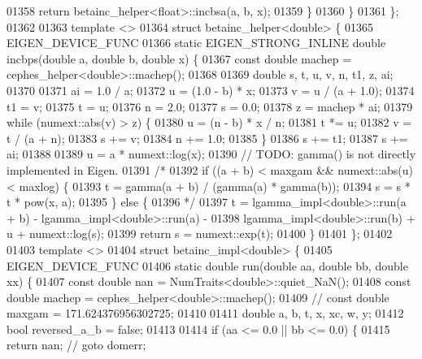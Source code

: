 \begin{DoxyCode}
01358       \textcolor{keywordflow}{return} betainc\_helper<float>::incbsa(a, b, x);
01359     \}
01360   \}
01361 \};
01362 
01363 \textcolor{keyword}{template} <>
01364 \textcolor{keyword}{struct }betainc\_helper<double> \{
01365   EIGEN\_DEVICE\_FUNC
01366   \textcolor{keyword}{static} EIGEN\_STRONG\_INLINE \textcolor{keywordtype}{double} incbps(\textcolor{keywordtype}{double} a, \textcolor{keywordtype}{double} b, \textcolor{keywordtype}{double} x) \{
01367     \textcolor{keyword}{const} \textcolor{keywordtype}{double} machep = cephes\_helper<double>::machep();
01368 
01369     \textcolor{keywordtype}{double} s, t, u, v, n, t1, z, ai;
01370 
01371     ai = 1.0 / a;
01372     u = (1.0 - b) * x;
01373     v = u / (a + 1.0);
01374     t1 = v;
01375     t = u;
01376     n = 2.0;
01377     s = 0.0;
01378     z = machep * ai;
01379     \textcolor{keywordflow}{while} (numext::abs(v) > z) \{
01380       u = (n - b) * x / n;
01381       t *= u;
01382       v = t / (a + n);
01383       s += v;
01384       n += 1.0;
01385     \}
01386     s += t1;
01387     s += ai;
01388 
01389     u = a * numext::log(x);
01390     \textcolor{comment}{// TODO: gamma() is not directly implemented in Eigen.}
01391     \textcolor{comment}{/*}
01392 \textcolor{comment}{    if ((a + b) < maxgam && numext::abs(u) < maxlog) \{}
01393 \textcolor{comment}{      t = gamma(a + b) / (gamma(a) * gamma(b));}
01394 \textcolor{comment}{      s = s * t * pow(x, a);}
01395 \textcolor{comment}{    \} else \{}
01396 \textcolor{comment}{    */}
01397     t = lgamma\_impl<double>::run(a + b) - lgamma\_impl<double>::run(a) -
01398         lgamma\_impl<double>::run(b) + u + numext::log(s);
01399     \textcolor{keywordflow}{return} s = numext::exp(t);
01400   \}
01401 \};
01402 
01403 \textcolor{keyword}{template} <>
01404 \textcolor{keyword}{struct }betainc\_impl<double> \{
01405   EIGEN\_DEVICE\_FUNC
01406   \textcolor{keyword}{static} \textcolor{keywordtype}{double} run(\textcolor{keywordtype}{double} aa, \textcolor{keywordtype}{double} bb, \textcolor{keywordtype}{double} xx) \{
01407     \textcolor{keyword}{const} \textcolor{keywordtype}{double} nan = NumTraits<double>::quiet\_NaN();
01408     \textcolor{keyword}{const} \textcolor{keywordtype}{double} machep = cephes\_helper<double>::machep();
01409     \textcolor{comment}{// const double maxgam = 171.624376956302725;}
01410 
01411     \textcolor{keywordtype}{double} a, b, t, x, xc, w, y;
01412     \textcolor{keywordtype}{bool} reversed\_a\_b = \textcolor{keyword}{false};
01413 
01414     \textcolor{keywordflow}{if} (aa <= 0.0 || bb <= 0.0) \{
01415       \textcolor{keywordflow}{return} nan;  \textcolor{comment}{// goto domerr;}

\end{DoxyCode}
